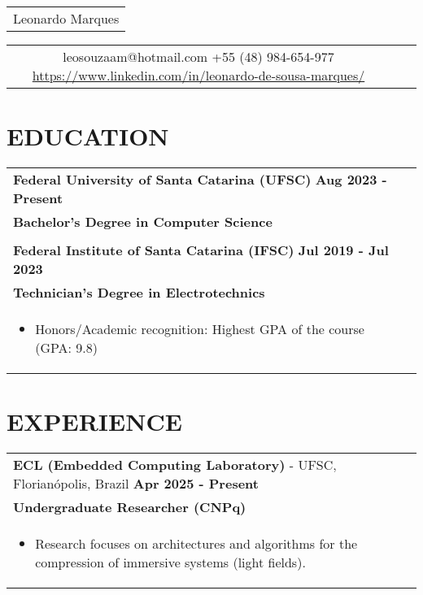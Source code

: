 \documentclass[a4paper,8pt]{article}
\begin{document}
\pagestyle{empty} 

\begin{tabularx}{\linewidth}{@{} C @{}}
\Huge{Leonardo Marques} \\[6pt]
\end{tabularx}

\begin{tabularx}{\linewidth}{@{} C @{} C @{} C}
{{\raisebox{-0.05\height}{\faEnvelope} leosouzaam@hotmail.com}} 
{{\raisebox{-0.05\height}{\faMobile} +55 (48) 984-654-977}} 
{{\href{https://www.linkedin.com/in/nameisjamiele}{\raisebox{-0.05\height}{\faLinkedin} https://www.linkedin.com/in/leonardo-de-sousa-marques/}}}
\end{tabularx}

\section{\textbf{EDUCATION}}
\begin{tabularx}{\linewidth}{ @{}l r@{}}
\textbf{Federal University of Santa Catarina (UFSC)} \hfill \textbf{Aug 2023 - Present} \\[4pt]
\textbf{Bachelor's Degree in Computer Science}\\[0.5pt]
\\ 
\textbf{Federal Institute of Santa Catarina (IFSC)} \hfill \textbf{Jul 2019 - Jul 2023}\\[4pt]
\textbf{Technician's Degree in Electrotechnics}\\[4pt]
\begin{minipage}[t]{\linewidth}
    \begin{itemize}[nosep, after=\strut, leftmargin=1em, itemsep=2pt]
        \item Honors/Academic recognition: Highest GPA of the course (GPA: 9.8)
    \end{itemize}
\end{minipage}
\end{tabularx}

\section{\textbf{EXPERIENCE}}

\begin{tabularx}{\linewidth}{ @{}l r@{} }
\textbf{ECL (Embedded Computing Laboratory)} - UFSC, Florianópolis, Brazil \hfill \textbf{Apr 2025 - Present} \\[4pt]
\textbf{Undergraduate Researcher (CNPq)} \\[4pt]
\begin{minipage}[t]{\linewidth}
    \begin{itemize}[nosep, after=\strut, leftmargin=1em, itemsep=2pt]
        \item Research focuses on architectures and algorithms for the compression of immersive systems (light fields).
    \end{itemize}
\end{minipage}
\end{tabularx}
\end{document}

